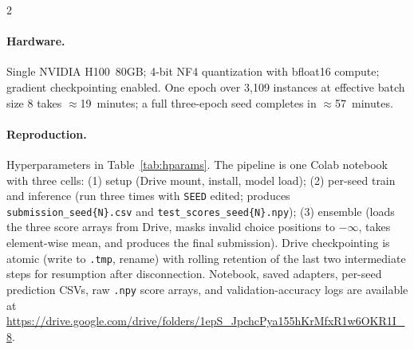 \documentclass[11pt,a4paper]{article}
\begin{document}
\begin{multicols}{2}
\paragraph{Hardware.} Single NVIDIA H100~80GB; 4-bit NF4 quantization with bfloat16 compute; gradient checkpointing enabled. One epoch over 3{,}109 instances at effective batch size 8 takes $\approx$19~minutes; a full three-epoch seed completes in $\approx$57~minutes.

\paragraph{Reproduction.} Hyperparameters in Table~\ref{tab:hparams}. The pipeline is one Colab notebook with three cells: (1) setup (Drive mount, install, model load); (2) per-seed train and inference (run three times with \texttt{SEED} edited; produces \texttt{submission\_seed\{N\}.csv} and \texttt{test\_scores\_seed\{N\}.npy}); (3) ensemble (loads the three score arrays from Drive, masks invalid choice positions to $-\infty$, takes element-wise mean, and produces the final submission). Drive checkpointing is atomic (write to \texttt{.tmp}, rename) with rolling retention of the last two intermediate steps for resumption after disconnection. Notebook, saved adapters, per-seed prediction CSVs, raw \texttt{.npy} score arrays, and validation-accuracy logs are available at \url{https://drive.google.com/drive/folders/1epS_JpchcPya155hKrMfxR1w6OKR1I_8}.


\end{multicols}
\end{document}
